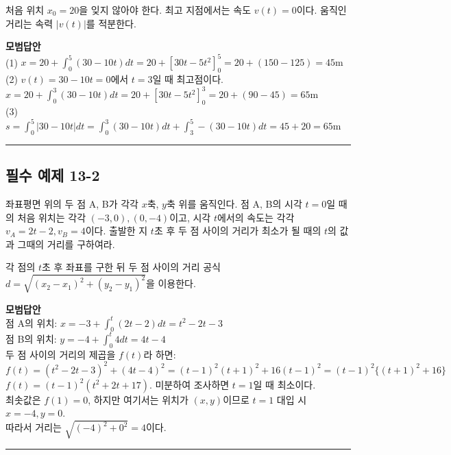 \documentclass[a4paper,11pt]{article}
\begin{document}
\begin{studybox}
처음 위치 $x_0=20$을 잊지 않아야 한다. 최고 지점에서는 속도 $v(t)=0$이다. 움직인 거리는 속력 $|v(t)|$를 적분한다.
\end{studybox}

\textbf{모범답안} \\
(1) $x = 20 + \int_{0}^{5} (30-10t) dt = 20 + [30t - 5t^2]_0^5 = 20 + (150-125) = 45\text{m}$ \\
(2) $v(t)=30-10t=0$에서 $t=3$일 때 최고점이다. \\
$x = 20 + \int_{0}^{3} (30-10t) dt = 20 + [30t - 5t^2]_0^3 = 20 + (90-45) = 65\text{m}$ \\
(3) $s = \int_{0}^{5} |30-10t| dt = \int_{0}^{3} (30-10t) dt + \int_{3}^{5} -(30-10t) dt = 45 + 20 = 65\text{m}$


\vspace{0.5cm}
\hrule
\vspace{0.5cm}

\subsection*{필수 예제 13-2}
좌표평면 위의 두 점 A, B가 각각 $x$축, $y$축 위를 움직인다. 점 A, B의 시각 $t=0$일 때의 처음 위치는 각각 $(-3, 0), (0, -4)$이고, 시각 $t$에서의 속도는 각각 $v_A = 2t-2, v_B = 4$이다. 출발한 지 $t$초 후 두 점 사이의 거리가 최소가 될 때의 $t$의 값과 그때의 거리를 구하여라.

\begin{studybox}
각 점의 $t$초 후 좌표를 구한 뒤 두 점 사이의 거리 공식 $d = \sqrt{(x_2-x_1)^2 + (y_2-y_1)^2}$을 이용한다.
\end{studybox}

\textbf{모범답안} \\
점 A의 위치: $x = -3 + \int_{0}^{t} (2t-2) dt = t^2 - 2t - 3$ \\
점 B의 위치: $y = -4 + \int_{0}^{t} 4 dt = 4t - 4$ \\
두 점 사이의 거리의 제곱을 $f(t)$라 하면: \\
$f(t) = (t^2-2t-3)^2 + (4t-4)^2 = (t-1)^2(t+1)^2 + 16(t-1)^2 = (t-1)^2 \{(t+1)^2 + 16\}$ \\
$f(t) = (t-1)^2 (t^2+2t+17)$. 미분하여 조사하면 $t=1$일 때 최소이다. \\
최솟값은 $f(1) = 0$, 하지만 여기서는 위치가 $(x, y)$이므로 $t=1$ 대입 시 $x = -4, y = 0$. \\
따라서 거리는 $\sqrt{(-4)^2 + 0^2} = 4$이다.

\vspace{0.5cm}
\hrule
\vspace{0.5cm}
\end{document}
